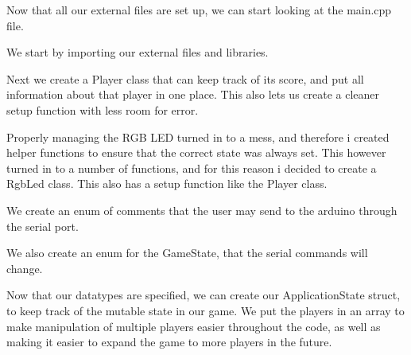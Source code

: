 \documentclass[journal]{IEEEtran}
\begin{document}



Now that all our external files are set up, we can start looking at the main.cpp file.

We start by importing our external files and libraries.


Next we create a Player class that can keep track of its score, and put
all information about that player in one place. This also lets us create a
cleaner setup function with less room for error.

\vfill\null
\pagebreak


Properly managing the RGB LED turned in to a mess, and therefore i created helper functions
to ensure that the correct state was always set. This however turned in to a number of functions,
and for this reason i decided to create a RgbLed class. This also has a setup function like the Player class.


We create an enum of comments that the user may send to the arduino through the serial port.


We also create an enum for the GameState, that the serial commands will change.

\vfill\null
\pagebreak


Now that our datatypes are specified, we can create our ApplicationState struct, to keep
track of the mutable state in our game. We put the players in an array to make
manipulation of multiple players easier throughout the code, as well as making it easier to
expand the game to more players in the future.
\end{document}
